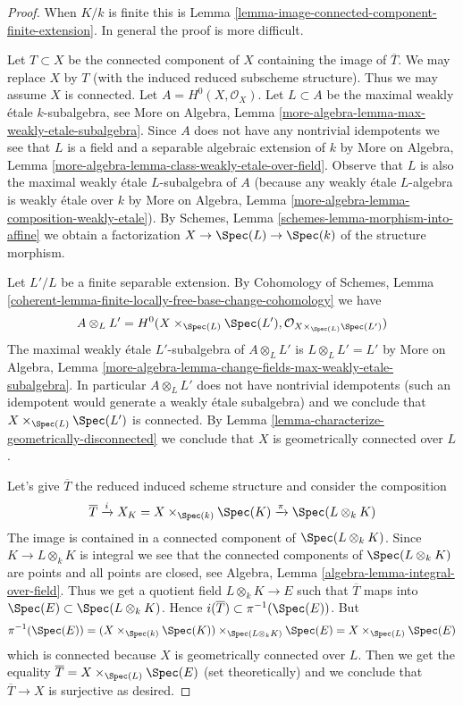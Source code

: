 \begin{proof}
When $K/k$ is finite this is
Lemma \ref{lemma-image-connected-component-finite-extension}.
In general the proof is more difficult.

\medskip\noindent
Let $T \subset X$ be the connected component of $X$ containing
the image of $\overline{T}$. We may replace $X$ by $T$
(with the induced reduced subscheme structure). Thus we
may assume $X$ is connected. Let $A = H^0(X, \mathcal{O}_X)$.
Let $L \subset A$ be the maximal weakly \'etale $k$-subalgebra, see
More on Algebra, Lemma \ref{more-algebra-lemma-max-weakly-etale-subalgebra}.
Since $A$ does not have any nontrivial idempotents we see
that $L$ is a field and a separable algebraic extension of $k$ by
More on Algebra, Lemma \ref{more-algebra-lemma-class-weakly-etale-over-field}.
Observe that $L$ is also the maximal weakly \'etale $L$-subalgebra of $A$
(because any weakly \'etale $L$-algebra is weakly \'etale over $k$
by More on Algebra, Lemma \ref{more-algebra-lemma-composition-weakly-etale}).
By Schemes, Lemma \ref{schemes-lemma-morphism-into-affine}
we obtain a factorization $X \to \Spec(L) \to \Spec(k)$
of the structure morphism.

\medskip\noindent
Let $L'/L$ be a finite separable extension. By
Cohomology of Schemes, Lemma
\ref{coherent-lemma-finite-locally-free-base-change-cohomology}
we have
$$
A \otimes_L L' =
H^0(X \times_{\Spec(L)} \Spec(L'), \mathcal{O}_{X \times_{\Spec(L)} \Spec(L')})
$$
The maximal weakly \'etale $L'$-subalgebra of $A \otimes_L L'$
is $L \otimes_L L' = L'$ by More on Algebra, Lemma
\ref{more-algebra-lemma-change-fields-max-weakly-etale-subalgebra}.
In particular $A \otimes_L L'$ does not have nontrivial idempotents
(such an idempotent would generate a weakly \'etale subalgebra)
and we conclude that $X \times_{\Spec(L)} \Spec(L')$ is connected.
By Lemma \ref{lemma-characterize-geometrically-disconnected}
we conclude that $X$ is geometrically connected over $L$.

\medskip\noindent
Let's give $\overline{T}$ the reduced induced scheme structure
and consider the composition
$$
\overline{T} \xrightarrow{i} X_K = X \times_{\Spec(k)} \Spec(K)
\xrightarrow{\pi}
\Spec(L \otimes_k K)
$$
The image is contained in a connected component of $\Spec(L \otimes_k K)$.
Since $K \to L \otimes_k K$ is integral we see that
the connected components of $\Spec(L \otimes_k K)$
are points and all points are closed, see
Algebra, Lemma \ref{algebra-lemma-integral-over-field}.
Thus we get a quotient field $L \otimes_k K \to E$
such that $\overline{T}$ maps into $\Spec(E) \subset \Spec(L \otimes_k K)$.
Hence $i(\overline{T}) \subset \pi^{-1}(\Spec(E))$. But
$$
\pi^{-1}(\Spec(E)) =
(X \times_{\Spec(k)} \Spec(K)) \times_{\Spec(L \otimes_k K)} \Spec(E) =
X \times_{\Spec(L)} \Spec(E)
$$
which is connected because $X$ is geometrically connected over $L$.
Then we get the equality
$\overline{T} = X \times_{\Spec(L)} \Spec(E)$ (set theoretically)
and we conclude that $\overline{T} \to X$ is surjective as desired.
\end{proof}

